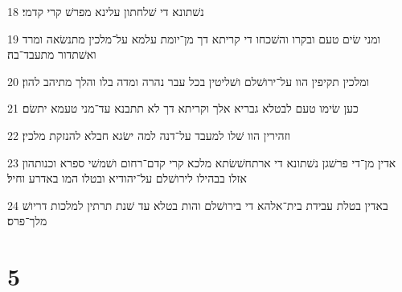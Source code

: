 \par 18 נשׁתונא די שׁלחתון עלינא מפרשׁ קרי קדמי׃
\par 19 ומני שׂים טעם ובקרו והשׁכחו די קריתא דך מן־יומת עלמא על־מלכין מתנשׂאה ומרד ואשׁתדור מתעבד־בה׃
\par 20 ומלכין תקיפין הוו על־ירושׁלם ושׁליטין בכל עבר נהרה ומדה בלו והלך מתיהב להון׃
\par 21 כען שׂימו טעם לבטלא גבריא אלך וקריתא דך לא תתבנא עד־מני טעמא יתשׂם׃
\par 22 וזהירין הוו שׁלו למעבד על־דנה למה ישׂגא חבלא להנזקת מלכין׃
\par 23 אדין מן־די פרשׁגן נשׁתונא די ארתחשׁשׂתא מלכא קרי קדם־רחום ושׁמשׁי ספרא וכנותהון אזלו בבהילו לירושׁלם על־יהודיא ובטלו המו באדרע וחיל׃
\par 24 באדין בטלת עבידת בית־אלהא די בירושׁלם והות בטלא עד שׁנת תרתין למלכות דריושׁ מלך־פרס׃

\chapter{5}

